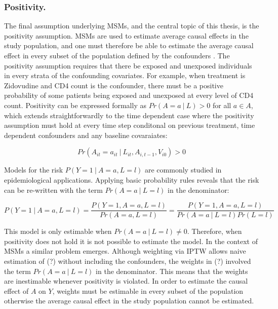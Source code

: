 \documentclass[11pt]{article}
\begin{document}
\subsubsection{Positivity.}\label{positivity.}

The final assumption underlying MSMs, and the central topic of this
thesis, is the positivity assumption. MSMs are used to estimate average
causal effects in the study population, and one must therefore be able
to estimate the average causal effect in every subset of the population
defined by the confounders \citet{Cole2008}. The positivity assumption
requires that there be exposed and unexposed individuals in every strata
of the confounding covariates. For example, when treatment is Zidovudine
and CD4 count is the confounder, there must be a positive probability of
some patients being exposed and unexposed at every level of CD4 count.
Positivity can be expressed formally as \(Pr(A=a\ |\ L) > 0\) for all
\(a \in A\), which extends straightforwardly to the time dependent case
where the positivity assumption must hold at every time step conditonal
on previous treatment, time dependent confounders and any baseline
covaraiates:

\[Pr(A_{it}=a_{it}\ |\ L_{it}, A_{i, t-1}, V_{i0}) > 0\]

Models for the risk \(P(Y=1\ |\ A=a, L=l)\) are commonly studied in
epidemiological applications. Applying basic probability rules reveals
that the risk can be re-written with the term \(Pr(A=a\ |\ L=l)\) in the
denominator:

\[P(Y=1\ |\ A=a, L=l) = \frac{P(Y=1, A=a, L=l)}{Pr(A=a, L=l)} = \frac{P(Y=1, A=a, L=l)}{Pr(A=a\ |\ L=l)Pr(L=l)}\]

This model is only estimable when \(Pr(A=a\ |\ L=l) \neq 0\). Therefore,
when positivity does not hold it is not possible to estimate the model.
In the context of MSMs a similar problem emerges. Although weighting via
IPTW allows naive estimation of (?) without including the confounders,
the weights in (?) involved the term \(Pr(A=a\ |\ L=l)\) in the
denominator. This means that the weights are inestimable whenever
positivity is violated. In order to estimate the causal effect of \(A\)
on \(Y\), weights must be estimable in every subset of the population
otherwise the average causal effect in the study population cannot be
estimated.
\end{document}

